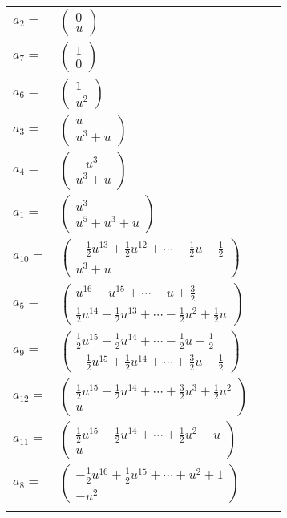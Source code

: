 \documentclass[1p]{elsarticle_modified}
\theoremstyle{definition}
\begin{document}
\begin{tabular}{m{7pt} m{180pt} m{7pt} m{180pt} }
\flushright $a_{2}=$&$\begin{pmatrix}0\\u\end{pmatrix}$ \\
\flushright $a_{7}=$&$\begin{pmatrix}1\\0\end{pmatrix}$ \\
\flushright $a_{6}=$&$\begin{pmatrix}1\\u^2\end{pmatrix}$ \\
\flushright $a_{3}=$&$\begin{pmatrix}u\\u^3+u\end{pmatrix}$ \\
\flushright $a_{4}=$&$\begin{pmatrix}- u^3\\u^3+u\end{pmatrix}$ \\
\flushright $a_{1}=$&$\begin{pmatrix}u^3\\u^5+u^3+u\end{pmatrix}$ \\
\flushright $a_{10}=$&$\begin{pmatrix}-\frac{1}{2} u^{13}+\frac{1}{2} u^{12}+\cdots-\frac{1}{2} u-\frac{1}{2}\\u^3+u\end{pmatrix}$ \\
\flushright $a_{5}=$&$\begin{pmatrix}u^{16}- u^{15}+\cdots- u+\frac{3}{2}\\\frac{1}{2} u^{14}-\frac{1}{2} u^{13}+\cdots-\frac{1}{2} u^2+\frac{1}{2} u\end{pmatrix}$ \\
\flushright $a_{9}=$&$\begin{pmatrix}\frac{1}{2} u^{15}-\frac{1}{2} u^{14}+\cdots-\frac{1}{2} u-\frac{1}{2}\\-\frac{1}{2} u^{15}+\frac{1}{2} u^{14}+\cdots+\frac{3}{2} u-\frac{1}{2}\end{pmatrix}$ \\
\flushright $a_{12}=$&$\begin{pmatrix}\frac{1}{2} u^{15}-\frac{1}{2} u^{14}+\cdots+\frac{3}{2} u^3+\frac{1}{2} u^2\\u\end{pmatrix}$ \\
\flushright $a_{11}=$&$\begin{pmatrix}\frac{1}{2} u^{15}-\frac{1}{2} u^{14}+\cdots+\frac{1}{2} u^2- u\\u\end{pmatrix}$ \\
\flushright $a_{8}=$&$\begin{pmatrix}-\frac{1}{2} u^{16}+\frac{1}{2} u^{15}+\cdots+u^2+1\\- u^2\end{pmatrix}$\\&\end{tabular}
\end{document}
